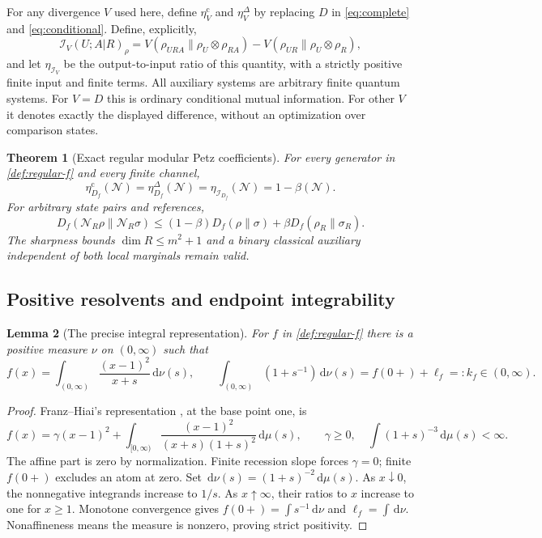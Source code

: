 \documentclass[11pt]{article}
\numberwithin{equation}{section}
\newtheorem{theorem}{Theorem}[section]
\newtheorem{lemma}[theorem]{Lemma}
\theoremstyle{definition}
\theoremstyle{remark}
\newcommand{\N}{\mathcal N}
\newcommand{\dd}{\,\mathrm d}
\begin{document}
For any divergence $V$ used here, define $\eta_V^{\mathrm c}$ and
$\eta_V^\Delta$ by replacing $D$ in \eqref{eq:complete} and
\eqref{eq:conditional}. Define, explicitly,
\begin{equation}
 \mathcal I_V(U;A|R)_\rho=
 V(\rho_{URA}\|\rho_U\otimes\rho_{RA})
 -V(\rho_{UR}\|\rho_U\otimes\rho_R),
 \label{eq:generalized-information}
\end{equation}
and let $\eta_{\mathcal I_V}$ be the output-to-input ratio of this
quantity, with a strictly positive finite input and finite terms.
All auxiliary systems are arbitrary finite quantum systems.
For $V=D$ this is ordinary conditional mutual information. For other
$V$ it denotes exactly the displayed difference, without an optimization
over comparison states.

\begin{theorem}[Exact regular modular Petz coefficients]
\label{thm:petz}
For every generator in \cref{def:regular-f} and every finite channel,
\begin{equation}
 \eta_{D_f}^{\mathrm c}(\N)
 =\eta_{D_f}^{\Delta}(\N)
 =\eta_{\mathcal I_{D_f}}(\N)
 =1-\beta(\N).
 \label{eq:petz-coefficients}
\end{equation}
For arbitrary state pairs and references,
\begin{equation}
 D_f(\N_R\rho\|\N_R\sigma)
 \leq(1-\beta)D_f(\rho\|\sigma)
       +\beta D_f(\rho_R\|\sigma_R).
 \label{eq:petz-upper}
\end{equation}
The sharpness bounds $\dim R\leq m^2+1$ and a binary classical
auxiliary independent of both local marginals remain valid.
\end{theorem}

\subsection{Positive resolvents and endpoint integrability}

\begin{lemma}[The precise integral representation]
\label{lem:resolvent-representation}
For $f$ in \cref{def:regular-f} there is a positive measure $\nu$ on
$(0,\infty)$ such that
\begin{equation}
 f(x)=\int_{(0,\infty)}\frac{(x-1)^2}{x+s}\dd\nu(s),
 \qquad
 \int_{(0,\infty)}(1+s^{-1})\dd\nu(s)
 =f(0+)+\ell_f=:k_f\in(0,\infty).
 \label{eq:resolvent-representation}
\end{equation}
\end{lemma}
\begin{proof}
Franz--Hiai's representation \cite[Theorem~2.2]{FH14}, at the base
point one, is
\[
 f(x)=\gamma(x-1)^2+
       \int_{[0,\infty)}
       \frac{(x-1)^2}{(x+s)(1+s)^2}\dd\mu(s),
 \qquad \gamma\geq0,\quad
 \int(1+s)^{-3}\dd\mu(s)<\infty.
\]
The affine part is zero by normalization. Finite recession slope
forces $\gamma=0$; finite $f(0+)$ excludes an atom at zero.
Set $\dd\nu(s)=(1+s)^{-2}\dd\mu(s)$.
As $x\downarrow0$, the nonnegative integrands increase to $1/s$.
As $x\uparrow\infty$, their ratios to $x$ increase to one for $x\geq1$.
Monotone convergence gives
$f(0+)=\int s^{-1}\dd\nu$ and $\ell_f=\int\dd\nu$.
Nonaffineness means the measure is nonzero, proving strict positivity.
\end{proof}
\end{document}
